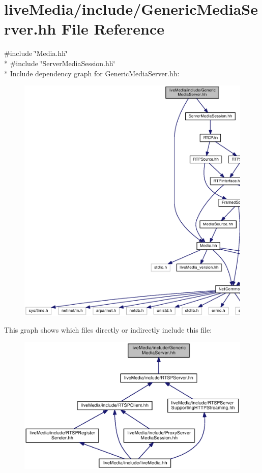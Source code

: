 \section{live\+Media/include/\+Generic\+Media\+Server.hh File Reference}
\label{GenericMediaServer_8hh}
{\ttfamily \#include \char`\"{}Media.\+hh\char`\"{}}\\*
{\ttfamily \#include \char`\"{}Server\+Media\+Session.\+hh\char`\"{}}\\*
Include dependency graph for Generic\+Media\+Server.\+hh\+:
\nopagebreak
\begin{figure}[H]
\begin{center}
\leavevmode
\includegraphics[width=350pt]{GenericMediaServer_8hh__incl}
\end{center}
\end{figure}
This graph shows which files directly or indirectly include this file\+:
\nopagebreak
\begin{figure}[H]
\begin{center}
\leavevmode
\includegraphics[width=350pt]{GenericMediaServer_8hh__dep__incl}
\end{center}
\end{figure}
